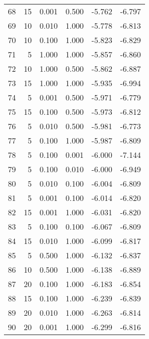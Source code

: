 \begin{tabular}{rrrrrr}
    68 &        15 &  0.001 & 0.500 &                 -5.762 &      -6.797 \\
    69 &        10 &  0.010 & 1.000 &                 -5.778 &      -6.813 \\
    70 &        10 &  0.100 & 1.000 &                 -5.823 &      -6.829 \\
    71 &         5 &  1.000 & 1.000 &                 -5.857 &      -6.860 \\
    72 &        10 &  1.000 & 0.500 &                 -5.862 &      -6.887 \\
    73 &        15 &  1.000 & 1.000 &                 -5.935 &      -6.994 \\
    74 &         5 &  0.001 & 0.500 &                 -5.971 &      -6.779 \\
    75 &        15 &  0.100 & 0.500 &                 -5.973 &      -6.812 \\
    76 &         5 &  0.010 & 0.500 &                 -5.981 &      -6.773 \\
    77 &         5 &  0.100 & 1.000 &                 -5.987 &      -6.809 \\
    78 &         5 &  0.100 & 0.001 &                 -6.000 &      -7.144 \\
    79 &         5 &  0.100 & 0.010 &                 -6.000 &      -6.949 \\
    80 &         5 &  0.010 & 0.100 &                 -6.004 &      -6.809 \\
    81 &         5 &  0.001 & 0.100 &                 -6.014 &      -6.820 \\
    82 &        15 &  0.001 & 1.000 &                 -6.031 &      -6.820 \\
    83 &         5 &  0.100 & 0.100 &                 -6.067 &      -6.809 \\
    84 &        15 &  0.010 & 1.000 &                 -6.099 &      -6.817 \\
    85 &         5 &  0.500 & 1.000 &                 -6.132 &      -6.837 \\
    86 &        10 &  0.500 & 1.000 &                 -6.138 &      -6.889 \\
    87 &        20 &  0.100 & 1.000 &                 -6.183 &      -6.854 \\
    88 &        15 &  0.100 & 1.000 &                 -6.239 &      -6.839 \\
    89 &        20 &  0.010 & 1.000 &                 -6.263 &      -6.814 \\
    90 &        20 &  0.001 & 1.000 &                 -6.299 &      -6.816 \\

\end{tabular}
